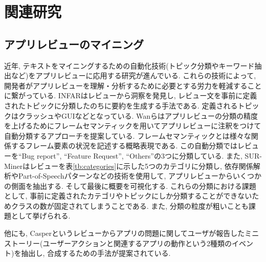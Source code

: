 \chapter{関連研究}
\label{chap:kanrenkenkyuu}





\section{アプリレビューのマイニング}
近年, テキストをマイニングするための自動化技術(トピック分類やキーワード抽出など)をアプリレビューに応用する研究が進んでいる. これらの技術によって, 開発者がアプリレビューを理解・分析するために必要とする労力を軽減することに繋がっている. 
INFAR\cite{infar}はレビューから洞察を発見し, レビュー文を事前に定義されたトピックに分類したのちに要約を生成する手法である. 定義されるトピックはクラッシュやGUIなどとなっている. 
Wanら\cite{dsa}はアプリレビューの分類の精度を上げるためにフレームセマンティックを用いてアプリレビューに注釈をつけて自動分類するアプローチを提案している. フレームセマンティックとは様々な関係するフレーム要素の状況を記述する概略表現である. この自動分類ではレビューを``Bug report'', ``Feature Request'', ``Others''の3つに分類している. 
また, SUR-Miner\cite{sur-miner}はレビューを表\ref{tb:categories}に示した5つのカテゴリに分類し, 依存関係解析やPart-of-Speechパターンなどの技術を使用して, アプリレビューからいくつかの側面を抽出する. そして最後に概要を可視化する. 
これらの分類における課題として, 事前に定義されたカテゴリやトピックにしか分類することができないためクラスの数が固定されてしまうことである. また, 分類の粒度が粗いことも課題として挙げられる. 

他にも, Casper\cite{caspar}というレビューからアプリの問題に関してユーザが報告したミニストーリー(ユーザーアクションと関連するアプリの動作という2種類のイベント)を抽出し, 合成するための手法が提案されている. 

